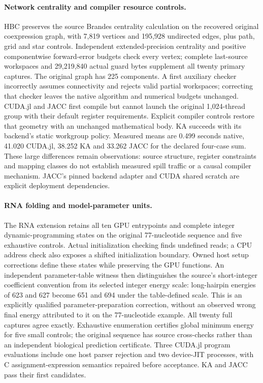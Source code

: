 \paragraph{Network centrality and compiler resource controls.}
HBC preserves the source Brandes centrality calculation on the recovered original coexpression graph, with 7,819 vertices and 195,928 undirected edges, plus path, grid and star controls. Independent extended-precision centrality and positive componentwise forward-error budgets check every vertex; complete last-source workspaces and 29,219,840 actual guard bytes supplement all twenty primary captures. The original graph has 225 components. A first auxiliary checker incorrectly assumes connectivity and rejects valid partial workspaces; correcting that checker leaves the native algorithm and numerical budgets unchanged. CUDA.jl and JACC first compile but cannot launch the original 1,024-thread group with their default register requirements. Explicit compiler controls restore that geometry with an unchanged mathematical body. KA succeeds with its backend's static workgroup policy. Measured means are 0.499 seconds native, 41.020 CUDA.jl, 38.252 KA and 33.262 JACC for the declared four-case sum. These large differences remain observations: source structure, register constraints and mapping classes do not establish measured spill traffic or a causal compiler mechanism. JACC's pinned backend adapter and CUDA shared scratch are explicit deployment dependencies.

\paragraph{RNA folding and model-parameter units.}
The RNA extension retains all ten GPU entrypoints and complete integer dynamic-programming states on the original 77-nucleotide sequence and five exhaustive controls. Actual initialization checking finds undefined reads; a CPU address check also exposes a shifted initialization boundary. Owned host setup corrections define these states while preserving the GPU functions. An independent parameter-table witness then distinguishes the source's short-integer coefficient convention from its selected integer energy scale: long-hairpin energies of 623 and 627 become 651 and 694 under the table-defined scale. This is an explicitly qualified parameter-preparation correction, without an observed wrong final energy attributed to it on the 77-nucleotide example. All twenty full captures agree exactly. Exhaustive enumeration certifies global minimum energy for five small controls; the original sequence has source cross-checks rather than an independent biological prediction certificate. Three CUDA.jl program evaluations include one host parser rejection and two device-JIT processes, with C assignment-expression semantics repaired before acceptance. KA and JACC pass their first candidates.

